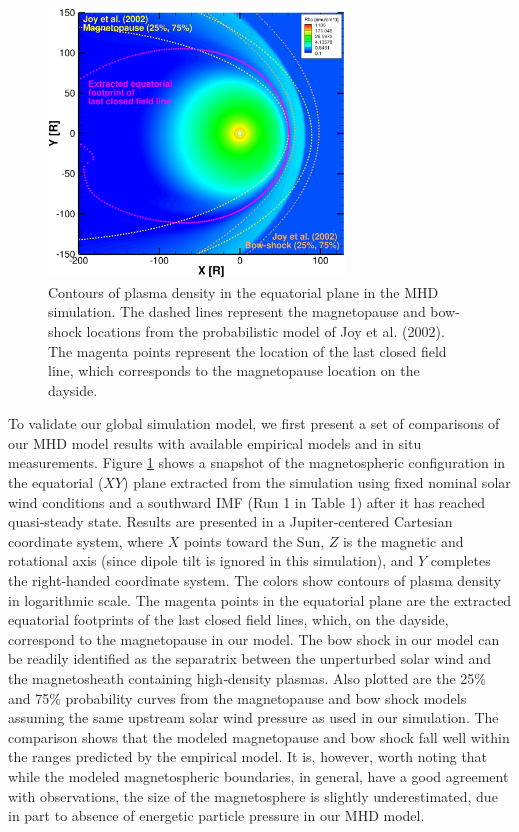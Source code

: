 \begin{figure}
    \centering
    \includegraphics[width=0.7\textwidth]{images2/magnetopause-xy.jpg}
    \caption{Contours of plasma density in the equatorial plane in the MHD simulation. The dashed lines represent the magnetopause and bow-shock locations from the probabilistic model of Joy et al. (2002). The magenta points represent the location of the last closed field line, which corresponds to the magnetopause location on the dayside.}
    \label{fig:magnetopause-xy}
\end{figure}

To validate our global simulation model, we first present a set of comparisons of our MHD model results with available empirical models and in situ measurements. Figure \ref{fig:magnetopause-xy} shows a snapshot of the magnetospheric configuration in the equatorial ($XY$) plane extracted from the simulation using fixed nominal solar wind conditions and a southward IMF (Run 1 in Table 1) after it has reached quasi‐steady state. Results are presented in a Jupiter‐centered Cartesian coordinate system, where $X$ points toward the Sun, $Z$ is the magnetic and rotational axis (since dipole tilt is ignored in this simulation), and $Y$ completes the right‐handed coordinate system. The colors show contours of plasma density in logarithmic scale. The magenta points in the equatorial plane are the extracted equatorial footprints of the last closed field lines, which, on the dayside, correspond to the magnetopause in our model. The bow shock in our model can be readily identified as the separatrix between the unperturbed solar wind and the magnetosheath containing high‐density plasmas. Also plotted are the 25\% and 75\% probability curves from the \cite{Joy2002a} magnetopause and bow shock models assuming the same upstream solar wind pressure as used in our simulation. The comparison shows that the modeled magnetopause and bow shock fall well within the ranges predicted by the  empirical model. It is, however, worth noting that while the modeled magnetospheric boundaries, in general, have a good agreement with observations, the size of the magnetosphere is slightly underestimated, due in part to absence of energetic particle pressure in our MHD model. 


